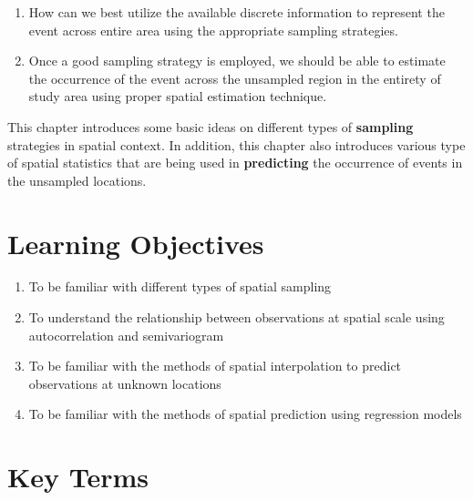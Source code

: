 \documentclass[
]{book}
\providecommand{\tightlist}{%
  \setlength{\itemsep}{0pt}\setlength{\parskip}{0pt}}
\begin{document}
\begin{enumerate}
\def\labelenumi{\arabic{enumi})}
\item
  How can we best utilize the available discrete information to represent the event across entire area using the appropriate sampling strategies.
\item
  Once a good sampling strategy is employed, we should be able to estimate the occurrence of the event across the unsampled region in the entirety of study area using proper spatial estimation technique.
\end{enumerate}

This chapter introduces some basic ideas on different types of \textbf{sampling} strategies in spatial context. In addition, this chapter also introduces various type of spatial statistics that are being used in \textbf{predicting} the occurrence of events in the unsampled locations.

\hypertarget{learning-objectives-9}{%
\section*{Learning Objectives}\label{learning-objectives-9}}

\begin{enumerate}
\def\labelenumi{\arabic{enumi}.}
\tightlist
\item
  To be familiar with different types of spatial sampling
\item
  To understand the relationship between observations at spatial scale using autocorrelation and semivariogram
\item
  To be familiar with the methods of spatial interpolation to predict observations at unknown locations
\item
  To be familiar with the methods of spatial prediction using regression models
\end{enumerate}

\hypertarget{key-terms-9}{%
\section*{Key Terms}\label{key-terms-9}}
\end{document}
